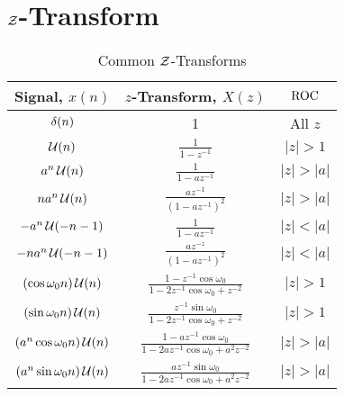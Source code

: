 \section{$\operatorname{\mathcal{Z}}$-Transform}
\begin{table}[h!]
  \centering
  \renewcommand{\arraystretch}{1.4}
  \begin{tabular}{ccc}
    \toprule
    Signal, $x(n)$ & $z$-Transform, $X(z)$ & $\operatorname{\mathrm{ROC}}$ \\
    \midrule
    $\operatorname{\delta}(n)$ & 1 & All $z$ \\
    $\operatorname{\mathcal{U}}(n)$ & $\frac{1}{1-z^{-1}}$ & $\lvert z \rvert > 1$ \\
    $a^{n}\operatorname{\mathcal{U}}(n)$ & $\frac{1}{1-az^{-1}}$ & $\lvert z \rvert > \lvert a \rvert$ \\
    $na^{n}\operatorname{\mathcal{U}}(n)$ & $\frac{az^{-1}}{{\left( 1-az^{-1} \right)}^{2}}$ & $\lvert z \rvert > \lvert a \rvert$ \\
    $-a^{n}\operatorname{\mathcal{U}}(-n-1)$ & $\frac{1}{1-az^{-1}}$ & $\lvert z \rvert < \lvert a \rvert$ \\
    $-na^{n}\operatorname{\mathcal{U}}(-n-1)$ & $\frac{az^{-z}}{{\left( 1-az^{-1} \right)}^{2}}$ & $\lvert z \rvert < \lvert a \rvert$ \\
    $\left( \cos \omega_{0}n \right) \operatorname{\mathcal{U}}(n)$ & $\frac{1-z^{-1}\cos \omega_{0}}{1-2z^{-1}\cos \omega_{0} + z^{-2}}$ & $\lvert z \rvert > 1$ \\
    $\left( \sin \omega_{0}n \right) \operatorname{\mathcal{U}}(n)$ & $\frac{z^{-1}\sin \omega_{0}}{1-2z^{-1}\cos \omega_{0} + z^{-2}}$ & $\lvert z \rvert > 1$ \\
    $\left( a^{n} \cos \omega_{0}n \right) \operatorname{\mathcal{U}}(n)$ & $\frac{1-az^{-1}\cos \omega_{0}}{1-2az^{-1} \cos \omega_{0} + a^{2}z^{-2}}$ & $\lvert z \rvert > \lvert a \rvert$ \\
        $\left( a^{n} \sin \omega_{0}n \right) \operatorname{\mathcal{U}}(n)$ & $\frac{az^{-1}\sin \omega_{0}}{1-2az^{-1} \cos \omega_{0} + a^{2}z^{-2}}$ & $\lvert z \rvert > \lvert a \rvert$ \\
    \bottomrule
  \end{tabular}
  \caption{Common $\operatorname{\mathcal{Z}}$-Transforms}
  \label{tab:Common Z-Transforms}
\end{table}

